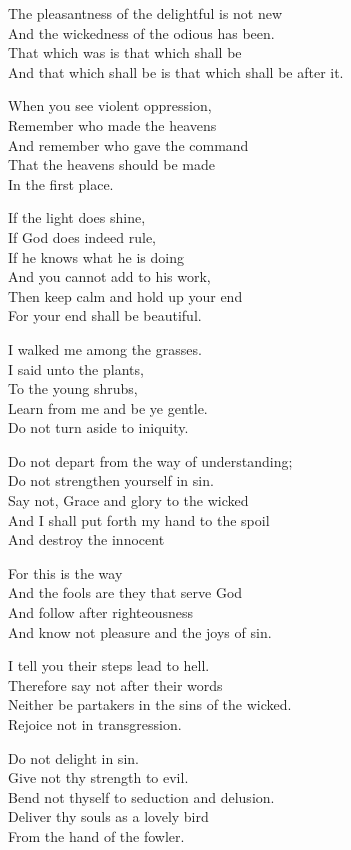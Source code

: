 \documentclass[
]{book}
\begin{document}
The pleasantness of the delightful is not new\\
And the wickedness of the odious has been.\\
That which was is that which shall be\\
And that which shall be is that which shall be after it.

When you see violent oppression,\\
Remember who made the heavens\\
And remember who gave the command\\
That the heavens should be made\\
In the first place.

If the light does shine,\\
If God does indeed rule,\\
If he knows what he is doing\\
And you cannot add to his work,\\
Then keep calm and hold up your end\\
For your end shall be beautiful.

I walked me among the grasses.\\
I said unto the plants,\\
To the young shrubs,\\
Learn from me and be ye gentle.\\
Do not turn aside to iniquity.

Do not depart from the way of understanding;\\
Do not strengthen yourself in sin.\\
Say not, Grace and glory to the wicked\\
And I shall put forth my hand to the spoil\\
And destroy the innocent

For this is the way\\
And the fools are they that serve God\\
And follow after righteousness\\
And know not pleasure and the joys of sin.

I tell you their steps lead to hell.\\
Therefore say not after their words\\
Neither be partakers in the sins of the wicked.\\
Rejoice not in transgression.

Do not delight in sin.\\
Give not thy strength to evil.\\
Bend not thyself to seduction and delusion.\\
Deliver thy souls as a lovely bird\\
From the hand of the fowler.
\end{document}
